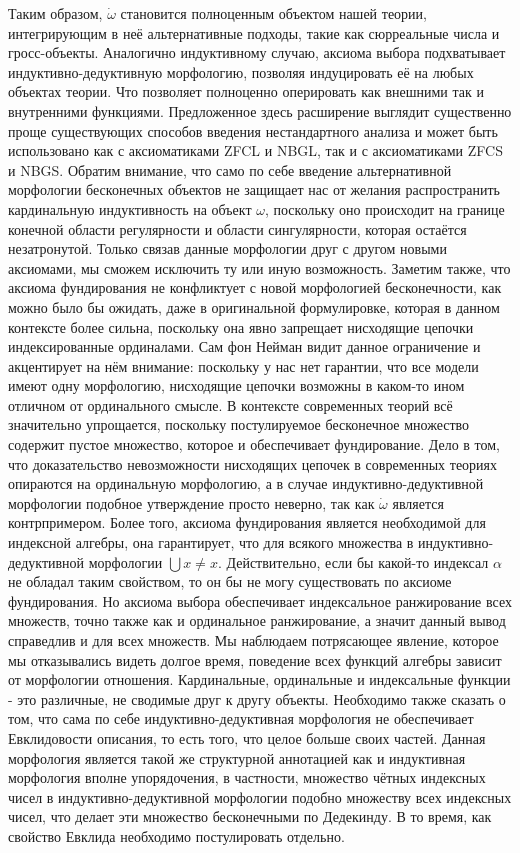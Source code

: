 \documentclass[12pt]{article}
\begin{document}
Таким образом, $\dot{\omega}$ становится полноценным объектом нашей теории, интегрирующим в неё альтернативные подходы, такие как сюрреальные числа и гросс-объекты. Аналогично индуктивному случаю, аксиома выбора подхватывает индуктивно-дедуктивную морфологию, позволяя индуцировать её на любых объектах теории. Что позволяет полноценно оперировать как внешними так и внутренними функциями. Предложенное здесь расширение выглядит существенно проще существующих способов введения нестандартного анализа и может быть использовано как с аксиоматиками ZFCL и NBGL, так и с аксиоматиками ZFCS и NBGS. Обратим внимание, что само по себе введение альтернативной морфологии бесконечных объектов не защищает нас от желания распространить кардинальную индуктивность на объект $\omega$, поскольку оно происходит на границе конечной области регулярности и области сингулярности, которая остаётся незатронутой. Только связав данные морфологии друг с другом новыми аксиомами, мы сможем исключить ту или иную возможность. Заметим также, что аксиома фундирования не конфликтует с новой морфологией бесконечности, как можно было бы ожидать, даже в оригинальной формулировке, которая в данном контексте более сильна, поскольку она явно запрещает нисходящие цепочки индексированные ординалами. Сам фон Нейман видит данное ограничение и акцентирует на нём внимание: поскольку у нас нет гарантии, что все модели имеют одну морфологию, нисходящие цепочки возможны в каком-то ином отличном от ординального смысле. В контексте современных теорий всё значительно упрощается, поскольку постулируемое бесконечное множество содержит пустое множество, которое и обеспечивает фундирование. Дело в том, что доказательство невозможности нисходящих цепочек в современных теориях опираются на ординальную морфологию, а в случае индуктивно-дедуктивной морфологии подобное утверждение просто неверно, так как $\dot{\omega}$ является контрпримером. Более того, аксиома фундирования является необходимой для индексной алгебры, она гарантирует, что для всякого множества в индуктивно-дедуктивной морфологии $\bigcup x \neq x$. Действительно, если бы какой-то индексал $\alpha$ не обладал таким свойством, то он бы не могу существовать по аксиоме фундирования. Но аксиома выбора обеспечивает индексальное ранжирование всех множеств, точно также как и ординальное ранжирование, а значит данный вывод справедлив и для всех множеств. Мы наблюдаем потрясающее явление, которое мы отказывались видеть долгое время, поведение всех функций алгебры зависит от морфологии отношения. Кардинальные, ординальные и индексальные функции - это различные, не сводимые друг к другу объекты. Необходимо также сказать о том, что сама по себе индуктивно-дедуктивная морфология не обеспечивает Евклидовости описания, то есть того, что целое больше своих частей. Данная морфология является такой же структурной аннотацией как и индуктивная морфология вполне упорядочения, в частности, множество чётных индексных чисел в индуктивно-дедуктивной морфологии подобно множеству всех индексных чисел, что делает эти множество бесконечными по Дедекинду. В то время, как свойство Евклида необходимо постулировать отдельно.
\end{document}
